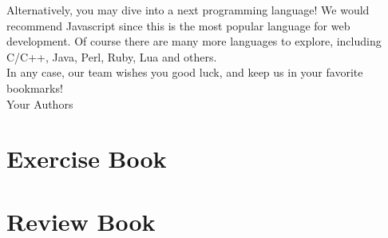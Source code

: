 \documentclass[article,A4,12pt]{llncs}
\begin{document}
Alternatively, you may dive into a next programming language! We would 
recommend Javascript since this is the most popular language for web 
development. Of course there are many more languages to explore, including 
C/C++, Java, Perl, Ruby, Lua and others.\\

\noindent
In any case, our team wishes you good luck, and keep us in your 
favorite bookmarks! \\

\hbox{} \hfill{} Your Authors



\part{Exercise Book}

\setcounter{section}{0}




\part{Review Book}


\end{document}
